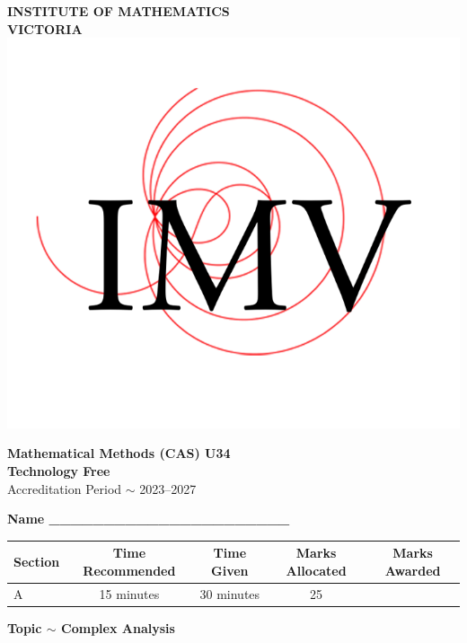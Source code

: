 \documentclass[a4paper,12pt]{article}
\begin{document}
\pagestyle{fancy}
\renewcommand{\headrulewidth}{0pt}  %
\fancyfoot[C]{}
\fancyfoot[R]{\thepage}

\begin{center}
    \vspace{0.2cm}
    
    \Huge \textbf{INSTITUTE OF MATHEMATICS \\ VICTORIA} \\
    \vspace{0.2cm}
    \includegraphics[width=0.2\linewidth]{IMV yt.png}
    \vspace{0.2cm}
    
    \LARGE \textbf{Mathematical Methods (CAS) U34} \\
    \vspace{0.2cm}
    \LARGE \textbf{Technology Free} \\
    \vspace{0.2cm}
    \Large Accreditation Period $\sim$ 2023--2027 \\
    \vspace{1cm}
    
    \normalsize \textbf{Name \_\_\_\_\_\_\_\_\_\_\_\_\_\_\_\_\_\_\_\_\_\_} \\
    \vspace{1cm}
    
    \begin{tabular}{|l|c|c|c|c|}
        \hline
        \textbf{Section} & \textbf{Time Recommended} & \textbf{Time Given} & \textbf{Marks Allocated} & \textbf{Marks Awarded} \\
        \hline
        A & 15 minutes & 30 minutes & 25 & \\
        \hline
    \end{tabular}
    
    \vspace{1cm}
    \LARGE \textbf{Topic $\sim$ Complex Analysis}
\end{center}
\end{document}
